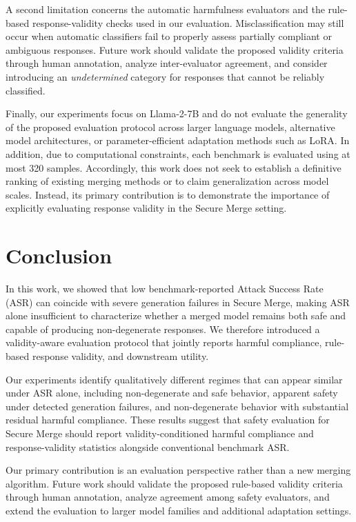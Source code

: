 \documentclass{article}
\begin{document}
A second limitation concerns the automatic harmfulness evaluators and the rule-based response-validity checks used in our evaluation. Misclassification may still occur when automatic classifiers fail to properly assess partially compliant or ambiguous responses. Future work should validate the proposed validity criteria through human annotation, analyze inter-evaluator agreement, and consider introducing an \textit{undetermined} category for responses that cannot be reliably classified.

Finally, our experiments focus on Llama-2-7B and do not evaluate the generality of the proposed evaluation protocol across larger language models, alternative model architectures, or parameter-efficient adaptation methods such as LoRA. In addition, due to computational constraints, each benchmark is evaluated using at most 320 samples. Accordingly, this work does not seek to establish a definitive ranking of existing merging methods or to claim generalization across model scales. Instead, its primary contribution is to demonstrate the importance of explicitly evaluating response validity in the Secure Merge setting.

\section{Conclusion}

In this work, we showed that low benchmark-reported Attack Success Rate (ASR) can coincide with severe generation failures in Secure Merge, making ASR alone insufficient to characterize whether a merged model remains both safe and capable of producing non-degenerate responses. We therefore introduced a validity-aware evaluation protocol that jointly reports harmful compliance, rule-based response validity, and downstream utility.

Our experiments identify qualitatively different regimes that can appear similar under ASR alone, including non-degenerate and safe behavior, apparent safety under detected generation failures, and non-degenerate behavior with substantial residual harmful compliance. These results suggest that safety evaluation for Secure Merge should report validity-conditioned harmful compliance and response-validity statistics alongside conventional benchmark ASR.

Our primary contribution is an evaluation perspective rather than a new merging algorithm. Future work should validate the proposed rule-based validity criteria through human annotation, analyze agreement among safety evaluators, and extend the evaluation to larger model families and additional adaptation settings.
\end{document}
